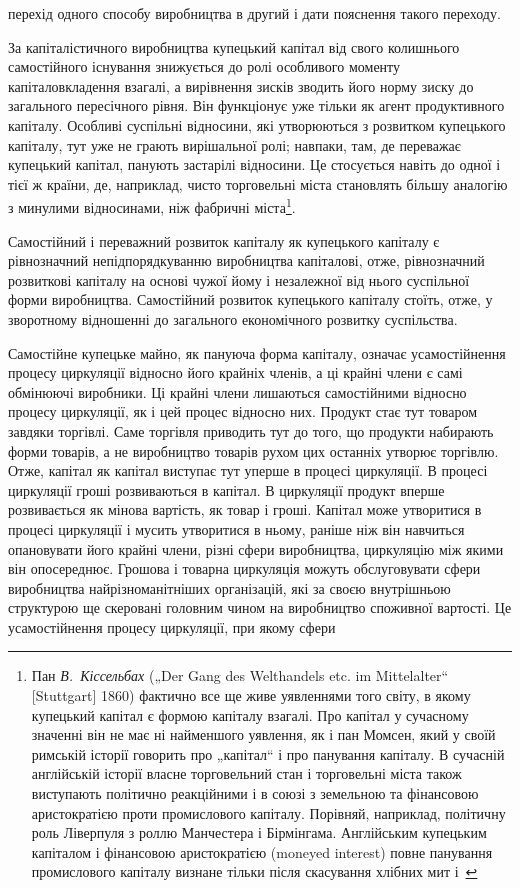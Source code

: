\parcont{}  %
перехід одного способу виробництва в другий і дати пояснення
такого переходу.

За капіталістичного виробництва купецький капітал від свого
колишнього самостійного існування знижується до ролі особливого
моменту капіталовкладення взагалі, а вирівнення зисків
зводить його норму зиску до загального пересічного рівня. Він
функціонує уже тільки як агент продуктивного капіталу. Особливі
суспільні відносини, які утворюються з розвитком купецького
капіталу, тут уже не грають вирішальної ролі; навпаки, там,
де переважає купецький капітал, панують застарілі відносини.
Це стосується навіть до одної і тієї ж країни, де, наприклад,
чисто торговельні міста становлять більшу аналогію з минулими
відносинами, ніж фабричні міста\footnote{
Пан \emph{В.~Кіссельбах} („Der Gang des Welthandels etc. im Mittelalter“ [Stuttgart]
1860) фактично все ще живе уявленнями того світу, в якому купецький
капітал є формою капіталу взагалі. Про капітал у сучасному значенні він не
має ні найменшого уявлення, як і пан Момсен, який у своїй римській історії
говорить про „капітал“ і про панування капіталу. В сучасній англійській історії
власне торговельний стан і торговельні міста також виступають політично
реакційними і в союзі з земельною та фінансовою аристократією проти промислового
капіталу. Порівняй, наприклад, політичну роль Ліверпуля з роллю Манчестера
і Бірмінгама. Англійським купецьким капіталом і фінансовою аристократією
(moneyed interest) повне панування промислового капіталу визнане
тільки після скасування хлібних мит і~
}.

Самостійний і переважний розвиток капіталу як купецького
капіталу є рівнозначний непідпорядкуванню виробництва капіталові,
отже, рівнозначний розвиткові капіталу на основі чужої
йому і незалежної від нього суспільної форми виробництва. Самостійний
розвиток купецького капіталу стоїть, отже, у зворотному
відношенні до загального економічного розвитку суспільства.

Самостійне купецьке майно, як пануюча форма капіталу,
означає усамостійнення процесу циркуляції відносно його крайніх
членів, а ці крайні члени є самі обмінюючі виробники. Ці крайні
члени лишаються самостійними відносно процесу циркуляції, як
і цей процес відносно них. Продукт стає тут товаром завдяки
торгівлі. Саме торгівля приводить тут до того, що продукти
набирають форми товарів, а не виробництво товарів рухом цих
останніх утворює торгівлю. Отже, капітал як капітал виступає тут
уперше в процесі циркуляції. В процесі циркуляції гроші розвиваються
в капітал. В циркуляції продукт вперше розвивається
як мінова вартість, як товар і гроші. Капітал може утворитися
в процесі циркуляції і мусить утворитися в ньому, раніше ніж
він навчиться опановувати його крайні члени, різні сфери виробництва,
циркуляцію між якими він опосереднює. Грошова і товарна
циркуляція можуть обслуговувати сфери виробництва найрізноманітніших
організацій, які за своєю внутрішньою структурою
ще скеровані головним чином на виробництво споживної
вартості. Це усамостійнення процесу циркуляції, при якому сфери
\parbreak{}  %
